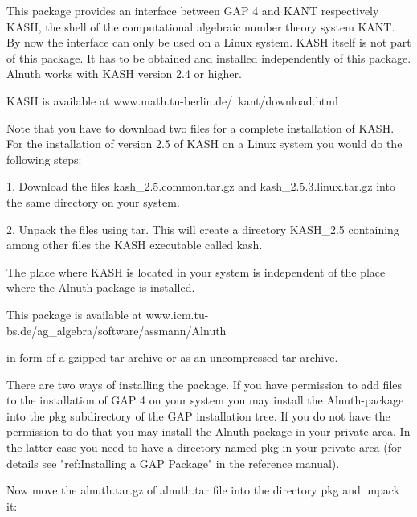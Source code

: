 

This package provides an interface between GAP 4 and KANT respectively
KASH, the shell of the computational algebraic number theory system KANT. By
now the interface can only be used on a Linux system.  KASH itself is not part
of this package.  It has to be obtained and installed independently of this
package. Alnuth works with KASH version 2.4 or higher.

 
KASH is available at
\begintt 
            www.math.tu-berlin.de/~kant/download.html
\endtt
 
Note that you have to download two files for a complete installation
of KASH. For the installation of version 2.5 of KASH on a Linux
system you would do the following steps:
\beginlist
\item{1.} Download the files
    kash_2.5.common.tar.gz and kash_2.5.3.linux.tar.gz
    into the same directory on your system.
 
\item{2.} Unpack the files using tar.  This will create a directory
    KASH_2.5 containing among other files the KASH executable called
    kash.

\endlist

The place where KASH is located in your system is independent of the place
 where the Alnuth-package is installed.

 
This package is available at
\begintt 
           www.icm.tu-bs.de/ag_algebra/software/assmann/Alnuth
\endtt 

in form of a gzipped tar-archive or as an uncompressed tar-archive.
 
There are two ways of installing the package.  If you have permission
to add files to the installation of GAP 4 on your system you may
install the Alnuth-package into the pkg subdirectory of the GAP
installation tree.  If you do not have the permission to do that you
may install the Alnuth-package in your private area. In the latter case you
need to have a directory named pkg in your private area (for details see
"ref:Installing a GAP Package" in the reference manual). 

Now move the alnuth.tar.gz of alnuth.tar file into the directory pkg and
unpack it:

